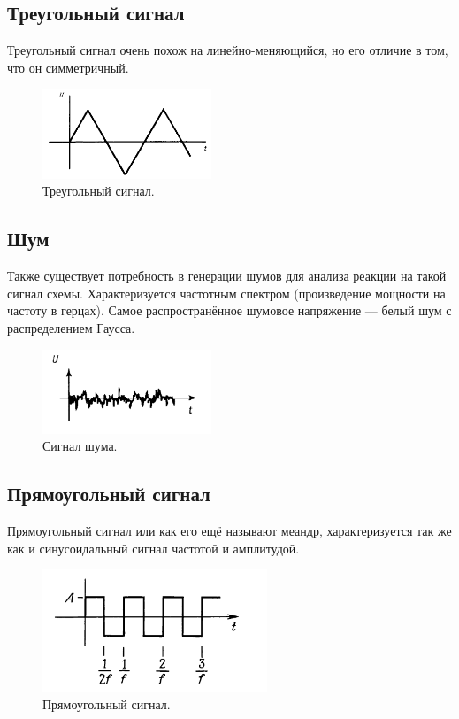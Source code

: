 \subsection{Треугольный сигнал}
	Треугольный сигнал очень похож на линейно-меняющийся, но его отличие в том, что он симметричный.

	\begin{figure}[H]
    \centering
    \includegraphics[width=0.45\textwidth]{../image/s_tri.png}
    \caption{Треугольный сигнал.}
	\end{figure}

\subsection{Шум}
	
	Также существует потребность в генерации шумов для анализа реакции на такой сигнал схемы. Характеризуется частотным спектром (произведение мощности на частоту в герцах). Самое распространённое шумовое напряжение --- белый шум с распределением Гаусса.  

	\begin{figure}[H]
    \centering
    \includegraphics[width=0.45\textwidth]{../image/s_noise.png}
    \caption{Сигнал шума.}
	\end{figure}

\subsection{Прямоугольный сигнал}
	Прямоугольный сигнал или как его ещё называют меандр, характеризуется так же как и синусоидальный сигнал частотой и амплитудой.
	\begin{figure}[H]
    \centering
    \includegraphics[width=0.6\textwidth]{../image/s_p.png}
    \caption{Прямоугольный сигнал.}
	\end{figure}

